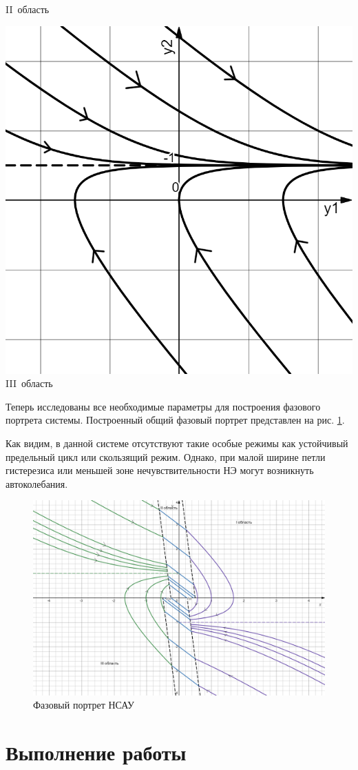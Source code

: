 {\begin{minipage}{.333\textwidth}
		II~область
	\end{minipage}	
	\begin{minipage}{.333\textwidth}
		\centering\includegraphics[width=.95\textwidth]{png/зона3.png}
		III~область
	\end{minipage}

	\label{tr}
}

	Теперь исследованы все необходимые параметры для построения фазового портрета системы. Построенный общий фазовый портрет представлен на рис. \ref{FP}. 
	
	Как видим, в данной системе отсутствуют такие особые режимы как устойчивый предельный цикл или скользящий режим. Однако, при малой ширине петли гистерезиса или меньшей зоне нечувствительности НЭ могут возникнуть автоколебания.	
	
	\begin{figure}[h]
		\centering\includegraphics[width=.8\textwidth]{png/FP.png}
		\caption{Фазовый портрет НСАУ}
		\label{FP}
	\end{figure}
	
	

	\section{Выполнение работы}

	


